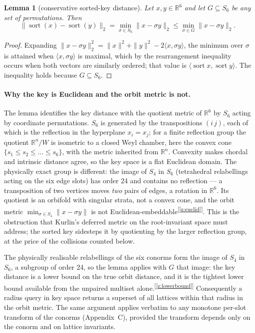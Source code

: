 \documentclass[11pt]{article}
\newtheorem{lemma}{Lemma}[section]
\newcommand{\chk}[1]{\textsuperscript{[\ref{#1}]}}
\begin{document}
\begin{lemma}[conservative sorted-key distance]
\label{lem:lb}
Let $x,y\in\mathbb R^6$ and let $G\subseteq S_6$ be any set of permutations. Then
\[
\|\operatorname{sort}(x)-\operatorname{sort}(y)\|_2=\min_{\sigma\in S_6}\|x-\sigma y\|_2\le\min_{\sigma\in G}\|x-\sigma y\|_2 .
\]
\end{lemma}
\begin{proof}
Expanding $\|x-\sigma y\|_2^2=\|x\|^2+\|y\|^2-2\langle x,\sigma y\rangle$, the minimum over $\sigma$ is attained when $\langle x,\sigma y\rangle$ is maximal, which by the rearrangement inequality occurs when both vectors are similarly ordered; that value is $\langle\operatorname{sort}x,\operatorname{sort}y\rangle$. The inequality holds because $G\subseteq S_6$.
\end{proof}

\paragraph{Why the key is Euclidean and the orbit metric is not.}
The lemma identifies the key distance with the quotient metric of $\mathbb R^6$ by $S_6$ acting by coordinate permutations. $S_6$ is generated by the transpositions $(i\,j)$, each of which is the reflection in the hyperplane $x_i=x_j$; for a finite reflection group the quotient $\mathbb R^n/W$ is isometric to a closed Weyl chamber, here the convex cone $\{s_1\le s_2\le\dots\le s_6\}$, with the metric inherited from $\mathbb R^n$. Convexity makes chordal and intrinsic distance agree, so the key space is a flat Euclidean domain. The physically exact group is different: the image of $S_4$ in $S_6$ (tetrahedral relabellings acting on the six edge slots) has order 24 and contains no reflection --- a transposition of two vertices moves \emph{two} pairs of edges, a rotation in $\mathbb R^6$. Its quotient is an orbifold with singular strata, not a convex cone, and the orbit metric $\min_{\sigma\in S_4}\|x-\sigma y\|$ is not Euclidean-embeddable\chk{z:euclid}. This is the obstruction that Kurlin's deferred metric on the root-invariant space must address; the sorted key sidesteps it by quotienting by the larger reflection group, at the price of the collisions counted below.

The physically realisable relabellings of the six conorms form the image of $S_4$ in $S_6$, a subgroup of order 24, so the lemma applies with $G$ that image: the key distance is a lower bound on the true orbit distance, and it is the tightest lower bound available from the unpaired multiset alone.\chk{z:lowerbound} Consequently a radius query in key space returns a superset of all lattices within that radius in the orbit metric. The same argument applies verbatim to any monotone per-slot transform of the conorms (Appendix~C), provided the transform depends only on the conorm and on lattice invariants.
\end{document}
